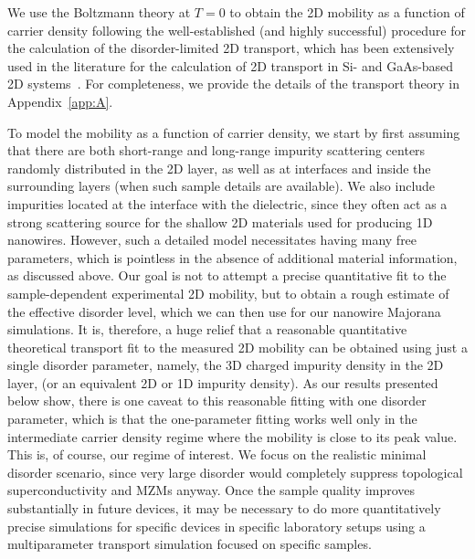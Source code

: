 \documentclass[aps,prmaterials,twocolumn,superscriptaddress,longbibliography]{revtex4-2}
\begin{document}
We use the Boltzmann theory at $ T=0 $  to obtain the 2D mobility as a function of carrier density following the well-established (and highly successful) procedure for the calculation of the disorder-limited 2D transport, which has been extensively used in the literature for the calculation of 2D transport in Si- and GaAs-based 2D systems~\cite{dassarma2015screening,ando1982electronic}. For completeness, we provide the details of the transport theory in Appendix~\ref{app:A}.

To model the mobility as a function of carrier density, we start by first assuming that there are both short-range and long-range impurity scattering centers randomly distributed in the 2D layer, as well as at interfaces and inside the surrounding layers (when such sample details are available). 
We also include impurities located at the interface with the dielectric, since they often act as a strong scattering source for the shallow 2D materials used for producing 1D nanowires.  However,  such a detailed model necessitates having many free parameters, which is pointless in the absence of additional material information, as discussed above.
Our goal is not to attempt a precise quantitative fit to the sample-dependent experimental 2D mobility, but to obtain a rough estimate of the effective disorder level, which we can then use for our nanowire Majorana simulations. 
 It is, therefore, a huge relief that a reasonable quantitative theoretical transport fit to the measured 2D mobility can be obtained using just a single disorder parameter, namely, the 3D charged impurity density in the 2D layer, (or an equivalent 2D or 1D impurity density). 
 As our results presented below show, there is one caveat to this reasonable fitting with one disorder parameter, which is that the one-parameter fitting works well only in the intermediate carrier density regime where the mobility is close to its peak value. This is, of course, our regime of interest. We focus on the realistic minimal disorder scenario, since very large disorder would completely suppress topological superconductivity and MZMs anyway. Once the sample quality improves substantially in future devices, it may be necessary to do more quantitatively precise simulations for specific devices in specific laboratory setups using a multiparameter transport simulation focused on specific samples.
\end{document}
